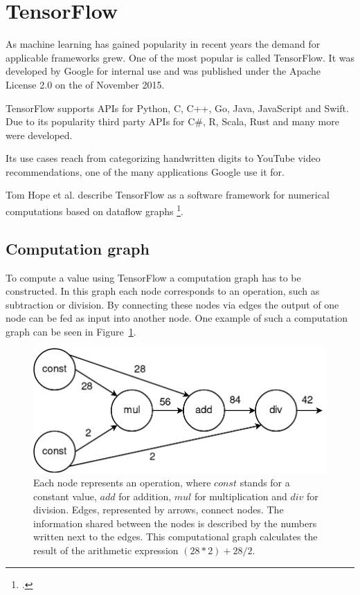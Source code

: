 \section{TensorFlow}
As machine learning has gained popularity in recent years the demand for applicable frameworks grew. One of the most popular is called TensorFlow. It was developed by Google for internal use and was published under the Apache License 2.0 on the  of November 2015.

TensorFlow supports APIs for Python, C, C++, Go, Java, JavaScript and Swift.
Due to its popularity third party APIs for C\#, R, Scala, Rust and many more were developed.

Its use cases reach from categorizing handwritten digits to YouTube video recommendations, one of the many applications Google use it for.

Tom Hope et al. describe TensorFlow as a software framework for numerical computations based on dataflow graphs \footcite[page 6]{Hope_Learning_TensorFlow}.

\subsection{Computation graph}
To compute a value using TensorFlow a computation graph has to be constructed. In this graph each node corresponds to an operation, such as subtraction or division. By connecting these nodes via edges the output of one node can be fed as input into another node. One example of such a computation graph can be seen in Figure~\ref{pic:methodology_tensorflow_computationGraph}.

\begin{figure}[h!]
	\centering
	\includegraphics[width=4.5in]{img/methodology_tensorflow_computationGraph.png}
	\caption{Each node represents an operation, where $const$ stands for a constant value, $add$ for addition, $mul$ for multiplication and $div$ for division. Edges, represented by arrows, connect nodes. The information shared between the nodes is described by the numbers written next to the edges. This computational graph calculates the result of the arithmetic expression $(28 * 2) + 28 / 2$.}
	\label{pic:methodology_tensorflow_computationGraph}
\end{figure}

